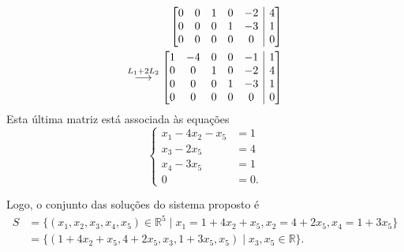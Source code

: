 \documentclass[12pt,a4paper]{article}
\makeatletter
\newcommand*\R{\mathbb{R}}
\newenvironment{amatrix}[1]{%
  \left[\begin{array}{@{}*{#1}{c}|c@{}}
}{%
  \end{array}\right]
}
\newcommand{\grstep}[2][\relax]{%
   \ensuremath{\mathrel{
       {\mathop{\longrightarrow}\limits^{#2\mathstrut}_{
                                     \begin{subarray}{l} #1 \end{subarray}}}}}}
\makeatother
\begin{document}
\begin{enumerate}
\begin{enumerate}
\begin{align*}
\begin{amatrix}{5}
0 &  0 &  1 &   0 & -2 & 4 \\
0 &  0 &  0 &   1 & -3 & 1 \\
0 &  0 &  0 &   0 &  0 &  0
\end{amatrix} \\
\grstep{ L_1 +2 L_2 }
\begin{amatrix}{5}
1 & -4 & 0 & 0 & -1 & 1 \\
0 &  0 & 1 & 0 & -2 & 4 \\
0 &  0 & 0 & 1 & -3 & 1 \\
0 &  0 & 0 & 0 &  0 &  0
\end{amatrix}
\end{align*}
Esta última matriz está associada às equações
\[
\left\{
\begin{aligned}
x_1 -4x_2-x_5 & =1 \\
x_3 -2x_5 & =4 \\
x_4 -3x_5 & =1 \\
0 & = 0.
\end{aligned}
\right.
\]

Logo, o conjunto das soluções do sistema proposto é
\begin{align*}
S
& = \{ (x_1, x_2, x_3, x_4, x_5 ) \in \R^5 \mid x_1 = 1 + 4x_2 + x_5, x_2 = 4 + 2x_5, x_4 = 1 + 3 x_5 \} \\
& = \{ (1 + 4x_2 + x_5, 4 + 2x_5, x_3, 1 + 3 x_5, x_5 ) \mid x_3,x_5 \in \R \}.
\end{align*}


\end{enumerate}
\end{enumerate}
\end{document}
